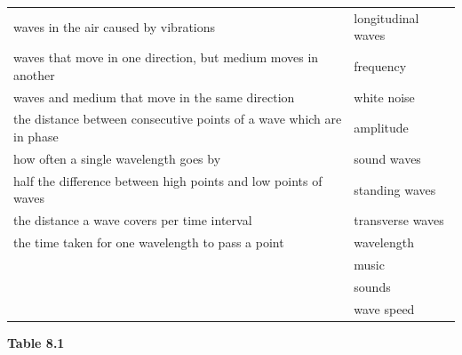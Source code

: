\begin{enumerate}[noitemsep, label=\textbf{\arabic*}. ]
\begin{table}[H]
\begin{center}
\begin{xtabular}[t]{|l|l|}
        waves in the air caused by vibrations &
        longitudinal waves%
     \tabularnewline{}
        waves that move in one direction, but medium moves in another &
        frequency%
     \tabularnewline{}
        waves and medium that move in the same direction &
        white noise%
     \tabularnewline{}
        the distance between consecutive points of a wave which are in phase &
        amplitude%
     \tabularnewline{}
        how often a single wavelength goes by &
        sound waves%
     \tabularnewline{}
        half the difference between high points and low points of waves &
        standing waves%
     \tabularnewline{}
        the distance a wave covers per time interval &
        transverse waves%
     \tabularnewline{}
        the time taken for one wavelength to pass a point &
        wavelength%
     \tabularnewline{}
         &
        music%
     \tabularnewline{}
         &
        sounds%
     \tabularnewline{}
         &
        wave speed%
     \tabularnewline{}
    \end{xtabular}
      \end{center}
    \begin{center}{\small\bfseries Table 8.1}\end{center}

\end{table}
\end{enumerate}
